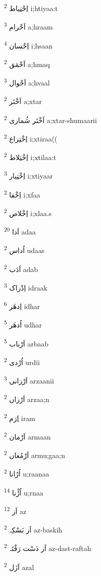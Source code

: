 \documentclass[12pt]{article}
\begin{document}
\begin{RTL}
\begin{multicols}{5}
{\ur اِحْتِیاط}   \textsuperscript{2} i;htiyaa:t

{\ur اَحْرام}   \textsuperscript{3} a;hraam

{\ur اِحْسان}   \textsuperscript{4} i;hsaan

{\ur اَحْمَق}   \textsuperscript{2} a;hmaq

{\ur اَحْوال}   \textsuperscript{3} a;hvaal

{\ur اَخْتَر}   \textsuperscript{2} a;xtar

{\ur اَخْتَر شُماری}   \textsuperscript{2} a;xtar-shumaarii

{\ur اِخْتِراع}   \textsuperscript{2} i;xtiraa((

{\ur اِخْتِلاط}   \textsuperscript{2} i;xtilaa:t

{\ur اِخْتِیار}   \textsuperscript{3} i;xtiyaar

{\ur اِخْفا}   \textsuperscript{2} i;xfaa

{\ur اِخْلاص}   \textsuperscript{2} i;xlaa.s

{\ur اَدا}   \textsuperscript{20} adaa

{\ur اُداس}   \textsuperscript{2} udaas

{\ur اَدَب}   \textsuperscript{2} adab

{\ur اِدْراک}   \textsuperscript{3} idraak

{\ur اِدھَر}   \textsuperscript{6} idhar

{\ur اُدھَر}   \textsuperscript{5} udhar

{\ur اَرْباب}   \textsuperscript{5} arbaab

{\ur اُرْدی}   \textsuperscript{2} urdii

{\ur اَرْزانی}   \textsuperscript{3} arzaanii

{\ur اَرْزاں}   \textsuperscript{2} arzaa;n

{\ur اِرَم}   \textsuperscript{2} iram

{\ur اَرْمان}   \textsuperscript{2} armaan

{\ur اَرْمُغاں}   \textsuperscript{2} armu;gaa;n

{\ur اُڑانا}   \textsuperscript{2} u;raanaa

{\ur اُڑْنا}   \textsuperscript{14} u;rnaa

{\ur اَز}   \textsuperscript{12} az

{\ur اَز بَسْکِہ}   \textsuperscript{2} az-baskih

{\ur اَز دَسْت رَفْتَہ}   \textsuperscript{2} az-dast-raftah

{\ur اَزَل}   \textsuperscript{2} azal


\end{multicols}
\end{RTL}
\end{document}
